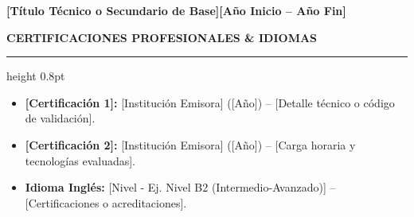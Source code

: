 \documentclass[9pt,a4paper]{extarticle}
\newcommand{\cvsection}[1]{%
  \vspace{4.5pt}%
  {\color{primary}\normalsize\bfseries\MakeUppercase{#1}}\par\vspace{1.5pt}%
  {\color{secondary}\hrule height 0.8pt}\par\vspace{3pt}%
}
\begin{document}
\vspace{1.0pt}

\noindent\textbf{\color{primary}\footnotesize [Título Técnico o Secundario de Base]}\hfill{\scriptsize\color{muted}\textbf{[Año Inicio -- Año Fin]}}\par
{}\par

\cvsection{Certificaciones Profesionales \& Idiomas}
\begin{itemize}
    \item \textbf{[Certificación 1]:} [Institución Emisora] ([Año]) -- [Detalle técnico o código de validación].
    \item \textbf{[Certificación 2]:} [Institución Emisora] ([Año]) -- [Carga horaria y tecnologías evaluadas].
    \item \textbf{Idioma Inglés:} [Nivel - Ej. Nivel B2 (Intermedio-Avanzado)] -- [Certificaciones o acreditaciones].
\end{itemize}
\end{document}
